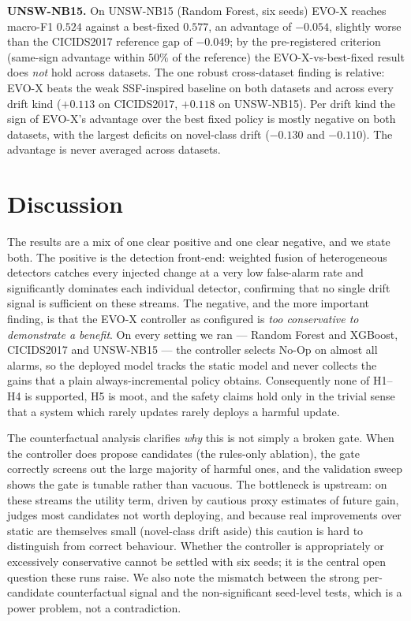 \documentclass[conference]{IEEEtran}
\newcommand{\evox}{\textsc{EVO-X}}
\begin{document}
\textbf{UNSW-NB15.} On UNSW-NB15 (Random Forest, six seeds) \evox{} reaches macro-F1 $0.524$ against a best-fixed $0.577$, an advantage of $-0.054$, slightly worse than the CICIDS2017 reference gap of $-0.049$; by the pre-registered criterion (same-sign advantage within $50\%$ of the reference) the \evox{}-vs-best-fixed result does \emph{not} hold across datasets. The one robust cross-dataset finding is relative: \evox{} beats the weak SSF-inspired baseline on both datasets and across every drift kind ($+0.113$ on CICIDS2017, $+0.118$ on UNSW-NB15). Per drift kind the sign of \evox{}'s advantage over the best fixed policy is mostly negative on both datasets, with the largest deficits on novel-class drift ($-0.130$ and $-0.110$). The advantage is never averaged across datasets.

\section{Discussion}
The results are a mix of one clear positive and one clear negative, and we state both. The positive is the detection front-end: weighted fusion of heterogeneous detectors catches every injected change at a very low false-alarm rate and significantly dominates each individual detector, confirming that no single drift signal is sufficient on these streams. The negative, and the more important finding, is that the \evox{} controller as configured is \emph{too conservative to demonstrate a benefit}. On every setting we ran --- Random Forest and XGBoost, CICIDS2017 and UNSW-NB15 --- the controller selects No-Op on almost all alarms, so the deployed model tracks the static model and never collects the gains that a plain always-incremental policy obtains. Consequently none of H1--H4 is supported, H5 is moot, and the safety claims hold only in the trivial sense that a system which rarely updates rarely deploys a harmful update.

The counterfactual analysis clarifies \emph{why} this is not simply a broken gate. When the controller does propose candidates (the rules-only ablation), the gate correctly screens out the large majority of harmful ones, and the validation sweep shows the gate is tunable rather than vacuous. The bottleneck is upstream: on these streams the utility term, driven by cautious proxy estimates of future gain, judges most candidates not worth deploying, and because real improvements over static are themselves small (novel-class drift aside) this caution is hard to distinguish from correct behaviour. Whether the controller is appropriately or excessively conservative cannot be settled with six seeds; it is the central open question these runs raise. We also note the mismatch between the strong per-candidate counterfactual signal and the non-significant seed-level tests, which is a power problem, not a contradiction.
\end{document}
